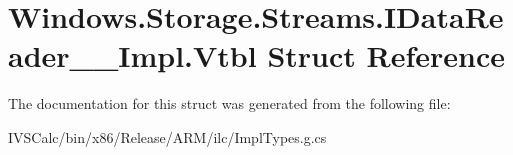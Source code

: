 \hypertarget{struct_windows_1_1_storage_1_1_streams_1_1_i_data_reader_____impl_1_1_vtbl}{}\section{Windows.\+Storage.\+Streams.\+I\+Data\+Reader\+\_\+\+\_\+\+Impl.\+Vtbl Struct Reference}
\label{struct_windows_1_1_storage_1_1_streams_1_1_i_data_reader_____impl_1_1_vtbl}


The documentation for this struct was generated from the following file\+:\begin{DoxyCompactItemize}
\item 
I\+V\+S\+Calc/bin/x86/\+Release/\+A\+R\+M/ilc/Impl\+Types.\+g.\+cs\end{DoxyCompactItemize}
